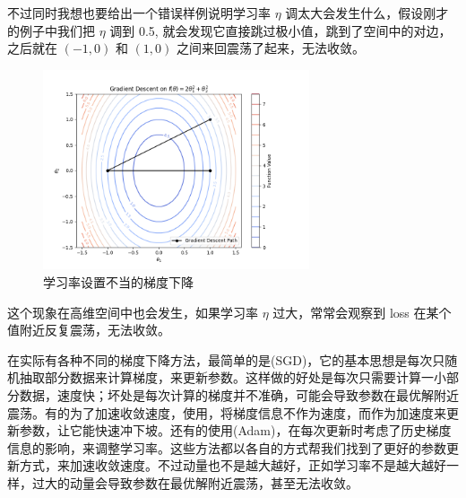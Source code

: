 不过同时我想也要给出一个错误样例说明学习率 $\eta$ 调太大会发生什么，假设刚才的例子中我们把 $\eta$ 调到 0.5, 就会发现它直接跳过极小值，跳到了空间中的对边，之后就在 $(-1, 0)$ 和 $(1, 0)$ 之间来回震荡了起来，无法收敛。
\begin{figure}[H]
    \centering
    \includegraphics[width=0.7\textwidth]{img/gradient_descent_0.5.png}
    \caption{学习率设置不当的梯度下降}
\end{figure}

这个现象在高维空间中也会发生，如果学习率 $\eta$ 过大，常常会观察到 loss 在某个值附近反复震荡，无法收敛。

在实际有各种不同的梯度下降方法，最简单的是(SGD)，它的基本思想是每次只随机抽取部分数据来计算梯度，来更新参数。这样做的好处是每次只需要计算一小部分数据，速度快；坏处是每次计算的梯度并不准确，可能会导致参数在最优解附近震荡。有的为了加速收敛速度，使用，将梯度信息不作为速度，而作为加速度来更新参数，让它能快速冲下坡。还有的使用(Adam)，在每次更新时考虑了历史梯度信息的影响，来调整学习率。这些方法都以各自的方式帮我们找到了更好的参数更新方式，来加速收敛速度。不过动量也不是越大越好，正如学习率不是越大越好一样，过大的动量会导致参数在最优解附近震荡，甚至无法收敛。

